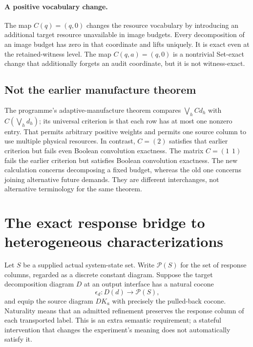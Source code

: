 \documentclass[11pt]{article}
\theoremstyle{definition}\newtheorem{definition}[theorem]{Definition}
\theoremstyle{remark}\newtheorem{remark}[theorem]{Remark}
\begin{document}
\paragraph{A positive vocabulary change.}
The map $C(q)=(q,0)$ changes the resource vocabulary by introducing an
additional target resource unavailable in image budgets. Every decomposition
of an image budget has zero in that coordinate and lifts uniquely. It is
exact even at the retained-witness level. The map $C(q,a)=(q,0)$ is a
nontrivial Set-exact change that additionally forgets an audit coordinate,
but it is not witness-exact.

\subsection{Not the earlier manufacture theorem}
The programme's adaptive-manufacture theorem compares
$\bigvee_h Cd_h$ with $C(\bigvee_h d_h)$; its universal criterion is
that each row has at most one nonzero entry. That permits arbitrary
positive weights and permits one source column to use multiple physical
resources. In contrast, $C=(2)$ satisfies that earlier criterion but
fails even Boolean convolution exactness. The matrix $C=(1\ \ 1)$
fails the earlier criterion but satisfies Boolean convolution exactness.
The new calculation concerns decomposing a fixed budget, whereas the old
one concerns joining alternative future demands. They are different
interchanges, not alternative terminology for the same theorem.

\section{The exact response bridge to heterogeneous characterizations}\label{sec:slice}
Let $S$ be a supplied actual system-state set. Write $\mathcal P(S)$
for the set of response columns, regarded as a discrete constant diagram.
Suppose the target decomposition diagram $D$ at an output interface has
a natural cocone
\[
 \epsilon_d:D(d)\longrightarrow\mathcal P(S),
\]
and equip the source diagram $DK_a$ with precisely the pulled-back cocone.
Naturality means that an admitted refinement preserves the response
column of each transported label. This is an extra semantic requirement;
a stateful intervention that changes the experiment's meaning does not
automatically satisfy it.
\end{document}
